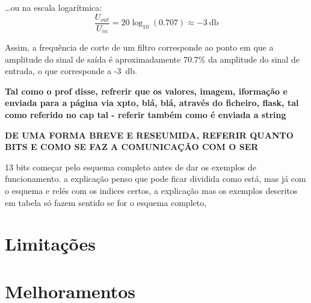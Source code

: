 	\ldots ou na escala logarítmica:  
\begin{equation} \label{eq:relacaoGanhodB}
	\frac{U_{out}}{U_{in}} = 20 \log_{10} (0.707) \approx -\SI{3}{\decibel}	
\end{equation}
	
Assim, a frequência de corte de um filtro corresponde ao ponto em que a amplitude do sinal de saída é aproximadamente $70.7\%$ da amplitude do sinal de entrada, o que corresponde a -\SI{3}{\decibel}. 


\textbf{Tal como o prof disse, refrerir que os valores, imagem, iformação e enviada para a página via xpto, blá, blá, através do ficheiro, flask, tal como referido no cap tal - referir também como é enviada a string}

\textbf{DE UMA FORMA BREVE E RESEUMIDA, REFERIR QUANTO BITS E COMO SE FAZ A COMUNICAÇÃO COM O SER}

13 bits começar pelo esquema completo antes de dar os exemplos de funcionamento. a explicação penso que pode ficar dividida como está, mas já com o esquema e relés com os indices certos, a explicação mas os exemplos descritos em tabela só fazem sentido se for o esquema completo,


\section{Limitações}
\section{Melhoramentos}


